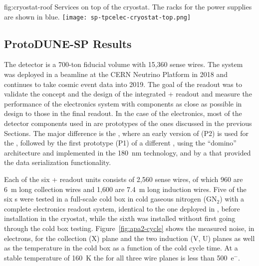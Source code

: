 \begin{dunefigure}
{fig:cryostat-roof}
{Services on top of the cryostat. The racks for the  power supplies are shown in blue.}
\texttt{[image: sp-tpcelec-cryostat-top.png]}
\end{dunefigure}

\subsection{ProtoDUNE-SP Results}
\label{sec:fdsp-tpcelec-overview-pdune}

The  detector is a 700-ton fiducial volume
 with 15,360 sense wires. 
The system was deployed in a beamline at the CERN Neutrino Platform 
in 2018 and continues to take cosmic event data into 2019. The goal of 
the   readout was to validate the concept 
and the design of the integrated + readout 
and measure the performance of the  electronics system with components 
as close as possible in design to those in the final   readout.
In the case of the  electronics, most of the detector components 
used in  are prototypes of the  ones discussed in the 
previous Sections. The major difference is the , where an
early version of  (P2) is used for the , followed
by the first prototype (P1) of a different , using the ``domino'' architecture 
and implemented in the \SI{180}{nm} technology, and by
a  that provided the data serialization functionality.

Each of the six  +
readout units consists of 2,560 sense wires, of which 960 are \SI{6}{m} 
long collection wires and 1,600 are \SI{7.4}{m} long induction wires. 
Five of the six s were tested in a full-scale cold box in 
cold gaseous nitrogen (GN$_2$) with a complete  electronics readout system,  
identical to the one %
deployed in , before installation in the cryostat,
while the sixth %
 was installed without first going through the cold
box testing. Figure~\ref{fig:apa2-cycle} shows the measured noise, in 
electrons, for the collection (X) plane and the two induction (V, U) 
planes as well as the  temperature in the cold box as a 
function of the cold cycle time. At a stable temperature of 
\SI{160}{K} the  for all three wire planes is less than 500~e$^-$.

